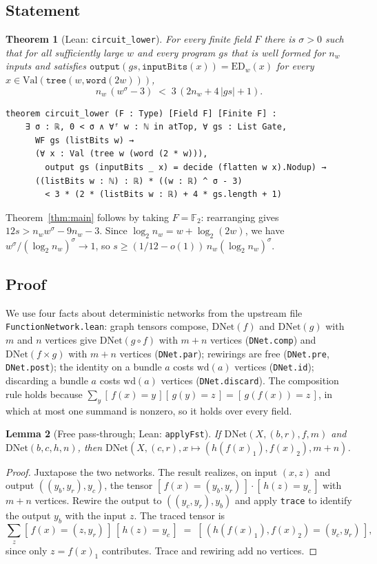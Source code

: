 \documentclass[11pt]{amsart}
\newtheorem{theorem}{Theorem}[section]
\newtheorem{lemma}[theorem]{Lemma}
\theoremstyle{definition}
\theoremstyle{remark}
\newcommand{\F}{\mathbb{F}}
\newcommand{\ED}{\mathrm{ED}}
\newcommand{\lean}[1]{\texttt{#1}}
\newcommand{\DNet}{\mathrm{DNet}}
\newcommand{\Val}{\mathrm{Val}}
\newcommand{\wdt}{\mathrm{wd}}
\newcommand{\ind}[1]{[\,#1\,]}
\begin{document}
\subsection{Statement}
\begin{theorem}[Lean: \lean{circuit\_lower}]\label{thm:circuit}
For every finite field $F$ there is $\sigma>0$ such that for all sufficiently large $w$ and every program $gs$ that is well formed for $n_w$ inputs and satisfies $\mathtt{output}(gs,\mathtt{inputBits}(x))=\ED_w(x)$ for every $x\in\Val(\mathtt{tree}(w,\mathtt{word}(2w)))$,
\[ n_w\,(w^{\sigma}-3) \;<\; 3\,(2n_w+4\,|gs|+1). \]
\end{theorem}

\begin{lstlisting}
theorem circuit_lower (F : Type) [Field F] [Finite F] :
    ∃ σ : ℝ, 0 < σ ∧ ∀ᶠ w : ℕ in atTop, ∀ gs : List Gate,
      WF gs (listBits w) →
      (∀ x : Val (tree w (word (2 * w))),
        output gs (inputBits _ x) = decide (flatten w x).Nodup) →
      ((listBits w : ℕ) : ℝ) * ((w : ℝ) ^ σ - 3)
        < 3 * (2 * (listBits w : ℝ) + 4 * gs.length + 1)
\end{lstlisting}

Theorem~\ref{thm:main} follows by taking $F=\F_2$: rearranging gives $12s>n_w w^{\sigma}-9n_w-3$. Since $\log_2 n_w=w+\log_2(2w)$, we have $w^{\sigma}/(\log_2 n_w)^{\sigma}\to 1$, so $s\ge(1/12-o(1))\,n_w(\log_2 n_w)^{\sigma}$.

\subsection{Proof}
We use four facts about deterministic networks from the upstream file \lean{FunctionNetwork.lean}: graph tensors compose, $\DNet(f)$ and $\DNet(g)$ with $m$ and $n$ vertices give $\DNet(g\circ f)$ with $m+n$ vertices (\lean{DNet.comp}) and $\DNet(f\times g)$ with $m+n$ vertices (\lean{DNet.par}); rewirings are free (\lean{DNet.pre}, \lean{DNet.post}); the identity on a bundle $a$ costs $\wdt(a)$ vertices (\lean{DNet.id}); discarding a bundle $a$ costs $\wdt(a)$ vertices (\lean{DNet.discard}). The composition rule holds because $\sum_y\ind{f(x)=y}\ind{g(y)=z}=\ind{g(f(x))=z}$, in which at most one summand is nonzero, so it holds over every field.

\begin{lemma}[Free pass-through; Lean: \lean{applyFst}]\label{lem:applyfst}
If $\DNet(X,(b,r),f,m)$ and $\DNet(b,c,h,n)$, then $\DNet(X,(c,r),x\mapsto(h(f(x)_1),f(x)_2),m+n)$.
\end{lemma}
\begin{proof}
Juxtapose the two networks. The result realizes, on input $(x,z)$ and output $((y_b,y_r),y_c)$, the tensor $\ind{f(x)=(y_b,y_r)}\cdot\ind{h(z)=y_c}$ with $m+n$ vertices. Rewire the output to $((y_c,y_r),y_b)$ and apply \lean{trace} to identify the output $y_b$ with the input $z$. The traced tensor is
\[ \sum_{z}\ind{f(x)=(z,y_r)}\,\ind{h(z)=y_c} \;=\; \ind{(h(f(x)_1),f(x)_2)=(y_c,y_r)}, \]
since only $z=f(x)_1$ contributes. Trace and rewiring add no vertices.
\end{proof}
\end{document}
